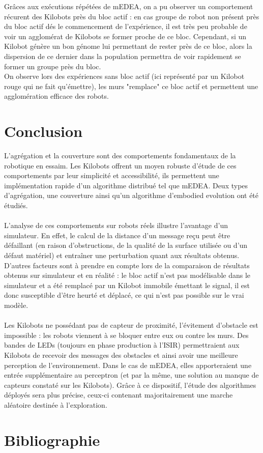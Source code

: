 \documentclass[a4paper]{article}
\begin{document}
Grâces aux exécutions répétées de mEDEA, on a pu observer un comportement récurent des Kilobots près du bloc actif : en cas groupe de robot non présent près du bloc actif dés le commencement de l'expérience, il est très peu probable de voir un agglomérat de Kilobots se former proche de ce bloc. Cependant, si un Kilobot génère un bon génome lui permettant de rester près de ce bloc, alors la dispersion de ce dernier dans la population permettra de voir rapidement se former un groupe près du bloc.\\
On observe lors des expériences sans bloc actif (ici représenté par un Kilobot rouge qui ne fait qu'émettre), les murs "remplace" ce bloc actif et permettent une agglomération efficace des robots.
\newpage
\section{Conclusion}
L’agrégation et la couverture sont des comportements fondamentaux de la robotique en essaim. Les Kilobots offrent un moyen robuste d’étude de ces comportements par leur simplicité et accessibilité, ils permettent une implémentation rapide d’un algorithme distribué tel que mEDEA. Deux types d’agrégation, une couverture ainsi qu’un algorithme d’embodied evolution ont été étudiés.
\\ \\
L’analyse de ces comportements sur robots réels illustre l’avantage d’un simulateur. En effet, le calcul de la distance d’un message reçu peut être défaillant (en raison d’obstructions, de la qualité de la surface utilisée ou d’un défaut matériel) et entraîner une perturbation quant aux résultats obtenus. D’autres facteurs sont à prendre en compte lors de la comparaison de résultats obtenus sur simulateur et en réalité : le bloc actif n’est pas modélisable dans le simulateur et a été remplacé par un Kilobot immobile émettant le signal, il est donc susceptible d’être heurté et déplacé, ce qui n’est pas possible sur le vrai modèle.
\\ \\
Les Kilobots ne possédant pas de capteur de proximité, l’évitement d’obstacle est impossible : les robots viennent à se bloquer entre eux ou contre les murs. Des bandes de LEDs (toujours en phase production à l’ISIR) permettraient aux Kilobots de recevoir des messages des obstacles et ainsi avoir une meilleure perception de l’environnement. Dans le cas de mEDEA, elles apporteraient une entrée supplémentaire au perceptron (et par la même, une solution au manque de capteurs constaté sur les Kilobots). Grâce à ce dispositif, l’étude des algorithmes déployés sera plus précise, ceux-ci contenant majoritairement une marche aléatoire destinée à l’exploration.
\newpage
\section{Bibliographie}

\printbibliography
\end{document}
